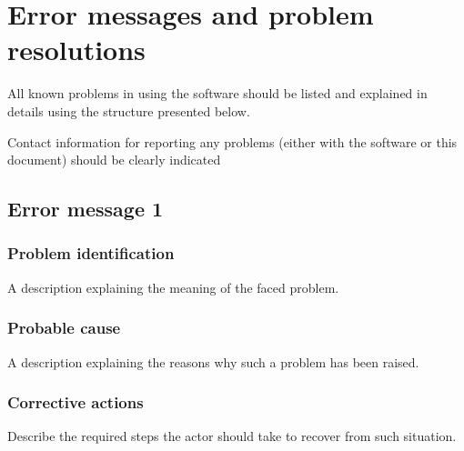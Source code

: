
\chapter{Error messages and problem resolutions}
\label{chap:error_messages}

All known problems in using the software should be listed and explained in
details using the structure presented below.

Contact information for reporting any problems (either with the software or
this document) should be clearly indicated


\section{Error message 1}

\subsection{Problem identification}
A description explaining the meaning of the faced problem.

\subsection{Probable cause}
A description explaining the reasons why such a problem has been raised.

\subsection{Corrective actions}
Describe the required steps the actor should take to recover from such situation.
